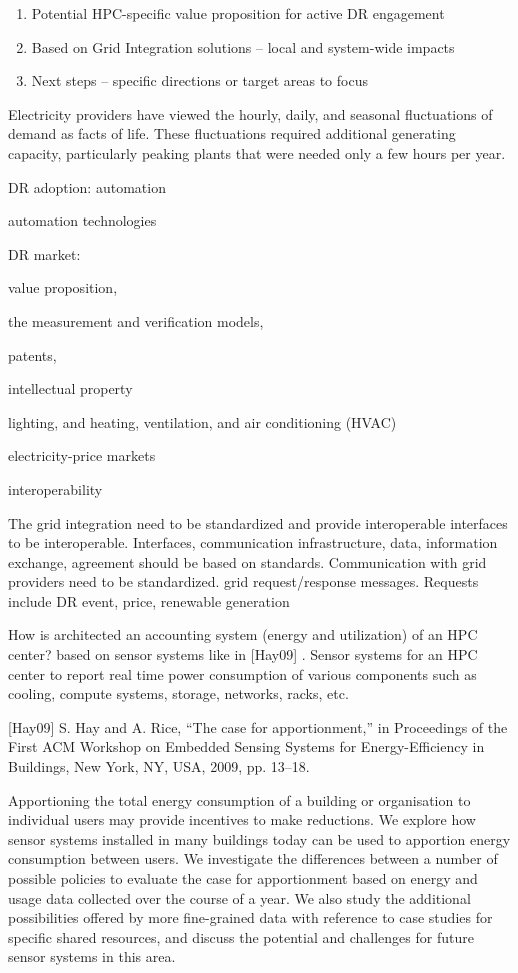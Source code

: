 
\begin{enumerate}
\item Potential HPC-specific value proposition for active DR engagement
\item Based on Grid Integration solutions -- local and system-wide impacts
\item Next steps -- specific directions or target areas to focus
\end{enumerate}

Electricity providers have viewed the hourly, daily, and seasonal
fluctuations of demand as facts of life. These fluctuations required
additional generating capacity, particularly peaking plants that were needed
only a few hours per year.

DR adoption: automation

automation technologies

DR market:

value proposition,

the measurement and verification models,

patents,

intellectual property

lighting, and heating, ventilation, and air conditioning (HVAC)

electricity-price markets

interoperability

The grid integration need to be standardized and provide interoperable
interfaces to be interoperable. Interfaces, communication infrastructure,
data, information exchange, agreement should be based on standards.
Communication with grid providers need to be standardized. grid
request/response messages. Requests include DR event, price, renewable
generation


How is architected an accounting system (energy and utilization) of an HPC
center? based on sensor systems like in [Hay09] . Sensor systems for an HPC
center to report real time power consumption of various components such as
cooling, compute systems, storage, networks, racks, etc.

[Hay09] S. Hay and A. Rice, ``The case for apportionment,'' in Proceedings
of the First ACM Workshop on Embedded Sensing Systems for Energy-Efficiency
in Buildings, New York, NY, USA, 2009, pp. 13--18.

Apportioning the total energy consumption of a building or organisation to
individual users may provide incentives to make reductions. We explore how
sensor systems installed in many buildings today can be used to apportion
energy consumption between users. We investigate the differences between a
number of possible policies to evaluate the case for apportionment based on
energy and usage data collected over the course of a year. We also study the
additional possibilities offered by more fine-grained data with reference to
case studies for specific shared resources, and discuss the potential and
challenges for future sensor systems in this area.

